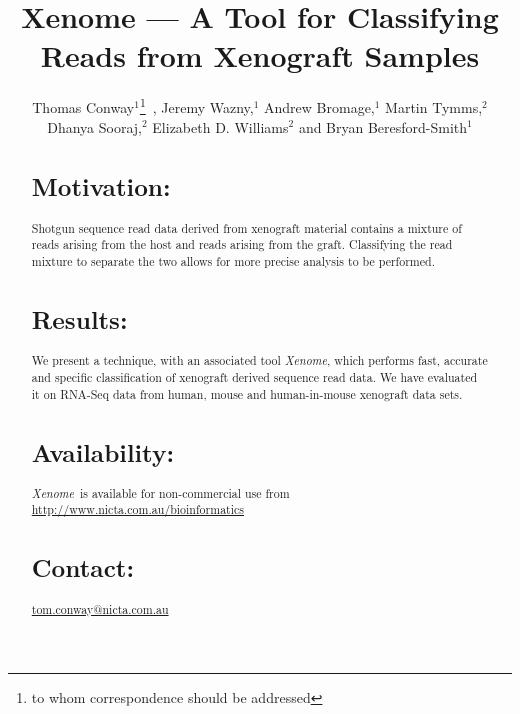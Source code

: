 \documentclass{bioinfo}
\newcommand{\Xenome}{\textit{Xenome}{}}
\begin{document}

\title[Xenome]{Xenome --- A Tool for Classifying Reads from Xenograft Samples}
\author[Conway \textit{et~al}]{
Thomas Conway$^{1}$\footnote{to whom correspondence should be addressed}\ , Jeremy Wazny,$^1$ Andrew Bromage,$^1$  
 Martin Tymms,$^2$ Dhanya Sooraj,$^2$ Elizabeth D. Williams$^2$
and Bryan Beresford-Smith$^1$}
\address{$^1$NICTA Victoria Research Laboratory, Department of Computer Science and Software Engineering, The University of Melbourne, Parkville, Australia\\
$^2$Monash Institute of Medical Research, Monash University, Clayton, Australia\\}





\maketitle

\begin{abstract}

\section{Motivation:}
Shotgun sequence read data derived from xenograft material contains a
mixture of reads arising from the host and reads arising from the graft.
Classifying the read mixture to separate the two allows for more precise analysis
to be performed.

\section{Results:}
We present a technique, with an associated tool \Xenome, which
performs fast, accurate and specific classification of xenograft derived
sequence read data. We have evaluated it on RNA-Seq data from human,
mouse and human-in-mouse xenograft data sets.

\section{Availability:}
\Xenome\ is available for non-commercial use 
from \href{http://www.nicta.com.au/bioinformatics}{http://www.nicta.com.au/bioinformatics}

\section{Contact:} \href{tom.conway@nicta.com.au}{tom.conway@nicta.com.au}
\end{abstract}
\end{document}
